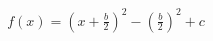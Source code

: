\documentclass[preview]{standalone}
\begin{document}
\begin{align*}
f(x)  = \left(x + \frac{b}{2}\right)^2 - \left(\frac{b}{2}\right)^2 + c
\end{align*}
\end{document}
